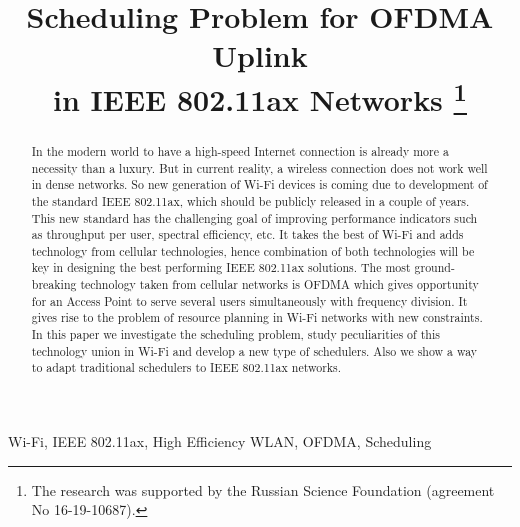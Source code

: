 
%


\IEEEoverridecommandlockouts

\title{%
Scheduling Problem for OFDMA Uplink \\in IEEE 802.11ax Networks
\thanks{The research was supported by the Russian Science Foundation (agreement No 16-19-10687).}}

\author{
}

\maketitle

\begin{abstract}
In the modern world to have a high-speed Internet connection is already more a necessity than a luxury. 
But in \textcolor{prpl}{current reality}, a wireless connection does not work well in dense networks. 
So new generation of Wi-Fi devices is coming due to development of the standard IEEE 802.11ax, which should be publicly released in a couple of years. 
This new standard has the challenging goal of improving performance indicators such as throughput per user, spectral efficiency, etc. 
It takes the best of Wi-Fi and adds technology from cellular technologies, hence combination of both technologies will be key in designing the best performing IEEE 802.11ax solutions. 
The most ground-breaking technology taken from cellular networks is OFDMA which gives opportunity for an Access Point to serve several users simultaneously with frequency division. 
It gives rise to the problem of resource planning in Wi-Fi networks with new constraints.
In this paper we investigate the scheduling problem, study peculiarities of this technology union in Wi-Fi and develop a new type of schedulers.
Also we show a way to adapt traditional schedulers to  IEEE 802.11ax networks.
\end{abstract}

\begin{IEEEkeywords}
Wi-Fi, IEEE 802.11ax, High Efficiency WLAN, OFDMA, Scheduling
\end{IEEEkeywords}

